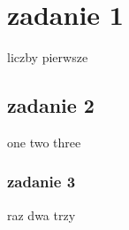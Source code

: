 \documentclass[a4paper]{article}
\begin{document}
\section{zadanie 1}
liczby pierwsze
\subsection{zadanie 2}
one two three
\subsubsection{zadanie 3}
raz dwa trzy
\end{document}
